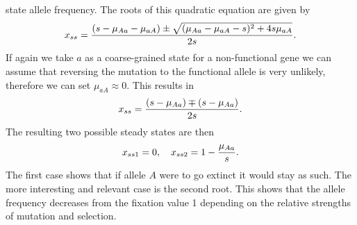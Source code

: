 state allele frequency. The roots of this quadratic equation are given by
\begin{equation}
  x_{ss} = {(s - \mu_{Aa} - \mu_{aA}) \pm 
    \sqrt{(\mu_{Aa} - \mu_{aA} - s)^2 + 4 s \mu_{aA}}
    \over 2s}.
\end{equation}
If again we take $a$ as a coarse-grained state for a non-functional gene we can
assume that reversing the mutation to the functional allele is very unlikely,
therefore we can set $\mu_{aA} \approx 0$. This results in
\begin{equation}
  x_{ss} = {(s - \mu_{Aa}) \mp (s - \mu_{Aa}) \over 2s}.
\end{equation}
The resulting two possible steady states are then
\begin{equation}
  x_{ss1} = 0, \quad x_{ss2} = 1 - {\mu_{Aa} \over s}.
\end{equation}
The first case shows that if allele $A$ were to go extinct it would stay as
such. The more interesting and relevant case is the second root. This shows
that the allele frequency decreases from the fixation value 1 depending on the
relative strengths of mutation and selection.